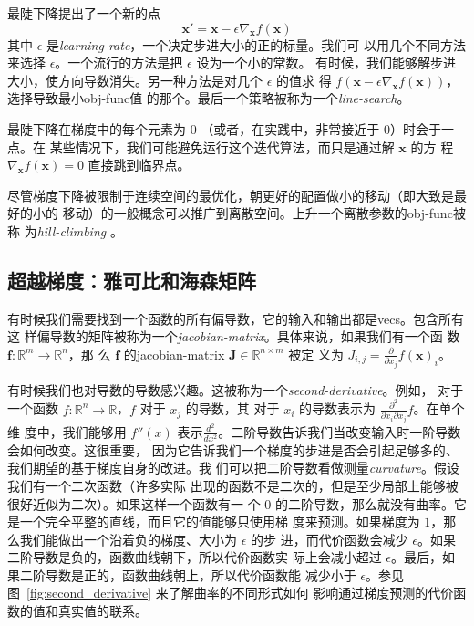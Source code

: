 最陡下降提出了一个新的点
\begin{equation}
  \pmb{x}' = \pmb{x} - \epsilon\nabla_{\pmb{x}}f(\pmb{x})
\end{equation}
其中 $\epsilon$ 是\emph{\gls{learning-rate}}，一个决定步进大小的正的标量。我们可
以用几个不同方法来选择 $\epsilon$。一个流行的方法是把 $\epsilon$ 设为一个小的常数。
有时候，我们能够解步进大小，使方向导数消失。另一种方法是对几个 $\epsilon$ 的值求
得
$f(\pmb{x} - \epsilon\nabla_{\pmb{x}}f(\pmb{x}))$，选择导致最小\gls*{obj-func}值
的那个。最后一个策略被称为一个\emph{\gls{line-search}}。

最陡下降在梯度中的每个元素为 $0$ （或者，在实践中，非常接近于 $0$）时会于一点。在
某些情况下，我们可能避免运行这个迭代算法，而只是通过解 $\pmb{x}$ 的方
程 $\nabla_{\pmb{x}}f(\pmb{x}) = 0$ 直接跳到临界点。

尽管梯度下降被限制于连续空间的最优化，朝更好的配置做小的移动（即大致是最好的小的
移动）的一般概念可以推广到离散空间。上升一个离散参数的\gls*{obj-func}被称
为\emph{\gls{hill-climbing}} \citep{Russel+Norvig-book2003}。

\subsection{超越梯度：雅可比和海森矩阵}
\label{subsec:beyong_the_gradient}

有时候我们需要找到一个函数的所有偏导数，它的输入和输出都是\gls*{vecs}。包含所有这
样偏导数的矩阵被称为一个\emph{\gls{jacobian-matrix}}。具体来说，如果我们有一个函
数 $\pmb{f}: \mathbb{R}^m \rightarrow \mathbb{R}^n$，那
么 $\pmb{f}$ 的\gls*{jacobian-matrix} $\pmb{J} \in \mathbb{R}^{n \times m}$ 被定
义为 $J_{i,j} = \frac{\partial}{\partial x_j}f(\pmb{x})_i$。

有时候我们也对导数的导数感兴趣。这被称为一个\emph{\gls{second-derivative}}。例如，
对于一个函数 $f: \mathbb{R}^n \rightarrow \mathbb{R}$，$f$ 对于 $x_j$ 的导数，其
对于 $x_i$ 的导数表示为 $\frac{\partial^2}{\partial x_i \partial x_j}f$。在单个维
度中，我们能够用 $f''(x)$
表示$\frac{d^2}{dx^2}$。二阶导数告诉我们当改变输入时一阶导数会如何改变。这很重要，
因为它告诉我们一个梯度的步进是否会引起足够多的、我们期望的基于梯度自身的改进。我
们可以把二阶导数看做测量\emph{\gls{curvature}}。假设我们有一个二次函数（许多实际
出现的函数不是二次的，但是至少局部上能够被很好近似为二次）。如果这样一个函数有一
个 $0$ 的二阶导数，那么就没有曲率。它是一个完全平整的直线，而且它的值能够只使用梯
度来预测。如果梯度为 $1$，那么我们能做出一个沿着负的梯度、大小为 $\epsilon$ 的步
进，而代价函数会减少 $\epsilon$。如果二阶导数是负的，函数曲线朝下，所以代价函数实
际上会减小超过 $\epsilon$。最后，如果二阶导数是正的，函数曲线朝上，所以代价函数能
减少小于 $\epsilon$。参见图~\ref{fig:second_derivative} 来了解曲率的不同形式如何
影响通过梯度预测的代价函数的值和真实值的联系。

